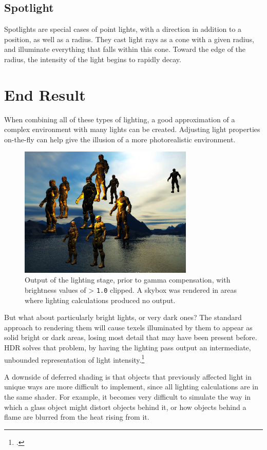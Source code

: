 \documentclass[11pt, oneside]{report}
\begin{document}
\subsection{Spotlight}
Spotlights are special cases of point lights, with a direction in addition to a position, as well as a radius. They cast light rays as a cone with a given radius, and illuminate everything that falls within this cone. Toward the edge of the radius, the intensity of the light begins to rapidly decay.

\section{End Result}
When combining all of these types of lighting, a good approximation of a complex environment with many lights can be created. Adjusting light properties on-the-fly can help give the illusion of a more photorealistic environment.

\begin{figure}[!htbp]
   \centering
   \includegraphics[width=0.74\textwidth, frame]{images/lighting_out.png}
   \caption{Output of the lighting stage, prior to gamma compensation, with brightness values of > \texttt{1.0} clipped. A \gls{skybox} was rendered in areas where lighting calculations produced no output.}
   \label{fig:f14}
\end{figure}

But what about particularly bright lights, or very dark ones? The standard approach to rendering them will cause \glspl{texel} illuminated by them to appear as solid bright or dark areas, losing most detail that may have been present before. \gls{HDR} solves that problem, by having the lighting pass output an intermediate, unbounded representation of light intensity.\footcite{trebilco-deferred}

A downside of deferred shading is that objects that previously affected light in unique ways are more difficult to implement, since all lighting calculations are in the same shader. For example, it becomes very difficult to simulate the way in which a glass object might distort objects behind it, or how objects behind a flame are blurred from the heat rising from it.
\end{document}
